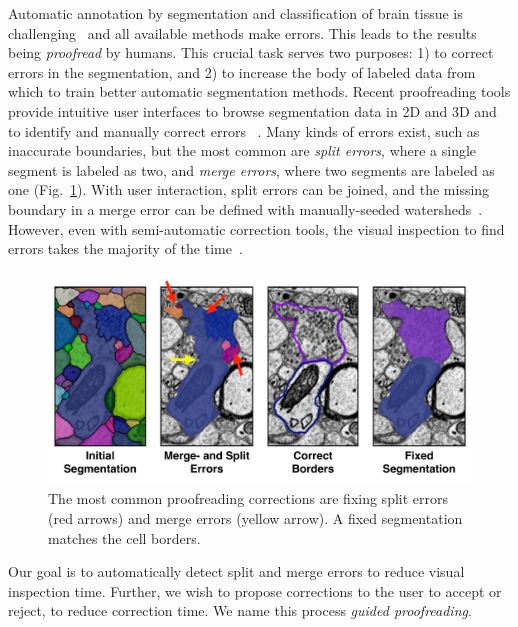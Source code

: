 Automatic annotation by segmentation and classification of brain tissue is challenging~\cite{isbi_challenge} and all available methods make errors. This leads to the results being \emph{proofread} by humans. This crucial task serves two purposes: 1) to correct errors in the segmentation, and 2) to increase the body of labeled data from which to train better automatic segmentation methods. Recent proofreading tools provide intuitive user interfaces to browse segmentation data in 2D and 3D and to identify and manually correct errors ~\cite{markus_proofreading,raveler,mojo2,haehn_dojo_2014}. Many kinds of errors exist, such as inaccurate boundaries, but the most common are \emph{split errors}, where a single segment is labeled as two, and \emph{merge errors}, where two segments are labeled as one (Fig.~\ref{fig:merge_and_slit_errors}). With user interaction, split errors can be joined, and the missing boundary in a merge error can be defined with manually-seeded watersheds~\cite{haehn_dojo_2014}. However, even with semi-automatic correction tools, the visual inspection to find errors takes the majority of the time~\cite{proofreading_bottleneck}.

\begin{figure}[t]
\begin{center}
  \includegraphics[width=\linewidth]{gfx/merge_and_split_errors.pdf}
\end{center}
\vspace{-4mm}
   \caption{The most common proofreading corrections are fixing split errors (red arrows) and merge errors (yellow arrow). A fixed segmentation matches the cell borders.}
\label{fig:merge_and_slit_errors}
\end{figure}

Our goal is to automatically detect split and merge errors to reduce visual inspection time. Further, we wish to propose corrections to the user to accept or reject, to reduce correction time. We name this process \textit{guided proofreading}.

